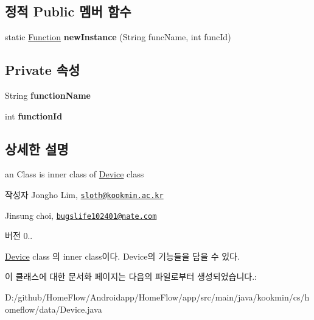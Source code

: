 \subsection*{정적 Public 멤버 함수}
\begin{DoxyCompactItemize}
\item 
\hypertarget{classkookmin_1_1cs_1_1homeflow_1_1data_1_1_device_1_1_function_a0ed84ea09c81e6b8815ec91d9045a057}{}static \hyperlink{classkookmin_1_1cs_1_1homeflow_1_1data_1_1_device_1_1_function}{Function} {\bfseries new\+Instance} (String func\+Name, int func\+Id)\label{classkookmin_1_1cs_1_1homeflow_1_1data_1_1_device_1_1_function_a0ed84ea09c81e6b8815ec91d9045a057}

\end{DoxyCompactItemize}
\subsection*{Private 속성}
\begin{DoxyCompactItemize}
\item 
\hypertarget{classkookmin_1_1cs_1_1homeflow_1_1data_1_1_device_1_1_function_a5321ffa1136b94b8727d23a44de8e397}{}String {\bfseries function\+Name}\label{classkookmin_1_1cs_1_1homeflow_1_1data_1_1_device_1_1_function_a5321ffa1136b94b8727d23a44de8e397}

\item 
\hypertarget{classkookmin_1_1cs_1_1homeflow_1_1data_1_1_device_1_1_function_a6f9bff7543180a9232c102c7169b8308}{}int {\bfseries function\+Id}\label{classkookmin_1_1cs_1_1homeflow_1_1data_1_1_device_1_1_function_a6f9bff7543180a9232c102c7169b8308}

\end{DoxyCompactItemize}


\subsection{상세한 설명}
an Class is inner class of \hyperlink{classkookmin_1_1cs_1_1homeflow_1_1data_1_1_device}{Device} class 

\begin{DoxyAuthor}{작성자}
Jongho Lim, \href{mailto:sloth@kookmin.ac.kr}{\tt sloth@kookmin.\+ac.\+kr} 

Jinsung choi, \href{mailto:bugslife102401@nate.com}{\tt bugslife102401@nate.\+com} 
\end{DoxyAuthor}
\begin{DoxyVersion}{버전}
0..
\end{DoxyVersion}
\hyperlink{classkookmin_1_1cs_1_1homeflow_1_1data_1_1_device}{Device} class 의 inner class이다. Device의 기능들을 담을 수 있다. 

이 클래스에 대한 문서화 페이지는 다음의 파일로부터 생성되었습니다.\+:\begin{DoxyCompactItemize}
\item 
D\+:/github/\+Home\+Flow/\+Androidapp/\+Home\+Flow/app/src/main/java/kookmin/cs/homeflow/data/Device.\+java\end{DoxyCompactItemize}
